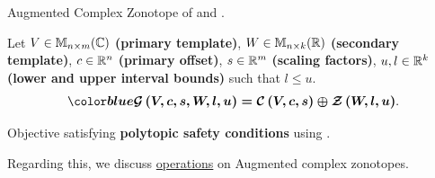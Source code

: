 \begin{frame}{Augmented Complex Zonotope}
 of  and .
\begin{definition}
Let $V\in\mathbb{M}_{n\times m}(\mathbb{C})$ {\bf (primary template)}, $W\in\mathbb{M}_{n\times k}(\mathbb{R})$
{\bf (secondary template)}, $c\in\mathbb{R}^n$ {\bf (primary offset)},
$s\in\mathbb{R}^m$ {\bf (scaling factors)}, $u,l\in\mathbb{R}^k$ {\bf (lower
and upper interval bounds)} such that $l\leq u$.  
\begin{equation*}
\bm{\textcol{\gcz{V}{c}{s}{W}{l}{u} = \cz{V}{c}{s}\oplus\zon{W}{l}{u}}}.
\end{equation*}
\end{definition}
\pause
\begin{alertblock}{Objective}
 satisfying {\bf polytopic safety conditions} using \underline{}.
\end{alertblock}
Regarding this, we discuss \underline{operations} on Augmented complex zonotopes.
\end{frame}

